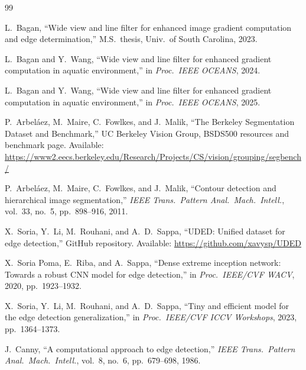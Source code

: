 \documentclass[conference]{IEEEtran}
\begin{document}
\begin{thebibliography}{99}

L.~Bagan, ``Wide view and line filter for enhanced image gradient computation and edge determination,'' M.S.\ thesis, Univ.\ of South Carolina, 2023.

L.~Bagan and Y.~Wang, ``Wide view and line filter for enhanced gradient computation in aquatic environment,'' in \textit{Proc.\ IEEE OCEANS}, 2024.

L.~Bagan and Y.~Wang, ``Wide view and line filter for enhanced gradient computation in aquatic environment,'' in \textit{Proc.\ IEEE OCEANS}, 2025.

P.~Arbel\'{a}ez, M.~Maire, C.~Fowlkes, and J.~Malik, ``The Berkeley Segmentation Dataset and Benchmark,'' UC Berkeley Vision Group, BSDS500 resources and benchmark page. Available: \url{https://www2.eecs.berkeley.edu/Research/Projects/CS/vision/grouping/segbench/}

P.~Arbel\'{a}ez, M.~Maire, C.~Fowlkes, and J.~Malik, ``Contour detection and hierarchical image segmentation,'' \textit{IEEE Trans.\ Pattern Anal.\ Mach.\ Intell.}, vol.~33, no.~5, pp.~898--916, 2011.

X.~Soria, Y.~Li, M.~Rouhani, and A.~D.~Sappa, ``UDED: Unified dataset for edge detection,'' GitHub repository. Available: \url{https://github.com/xavysp/UDED}

X.~Soria Poma, E.~Riba, and A.~Sappa, ``Dense extreme inception network: Towards a robust CNN model for edge detection,'' in \textit{Proc.\ IEEE/CVF WACV}, 2020, pp.~1923--1932.

X.~Soria, Y.~Li, M.~Rouhani, and A.~D.~Sappa, ``Tiny and efficient model for the edge detection generalization,'' in \textit{Proc.\ IEEE/CVF ICCV Workshops}, 2023, pp.~1364--1373.

J.~Canny, ``A computational approach to edge detection,'' \textit{IEEE Trans.\ Pattern Anal.\ Mach.\ Intell.}, vol.~8, no.~6, pp.~679--698, 1986.

\end{thebibliography}
\end{document}

